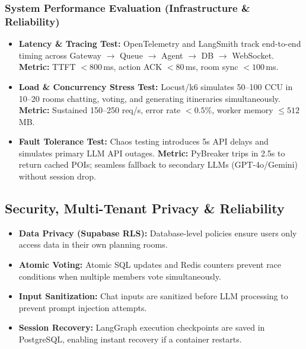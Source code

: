 \documentclass[11pt,a4paper]{article}
\begin{document}
\subsubsection{System Performance Evaluation (Infrastructure \& Reliability)}
\begin{itemize}[leftmargin=1.2em]
\item \textbf{Latency \& Tracing Test:} OpenTelemetry and LangSmith track end-to-end timing across Gateway $\rightarrow$ Queue $\rightarrow$ Agent $\rightarrow$ DB $\rightarrow$ WebSocket.
\textbf{Metric:} TTFT $< 800$\,ms, action ACK $< 80$\,ms, room sync $< 100$\,ms.
\item \textbf{Load \& Concurrency Stress Test:} Locust/k6 simulates 50--100 CCU in 10--20 rooms chatting, voting, and generating itineraries simultaneously.
\textbf{Metric:} Sustained 150--250 req/s, error rate $< 0.5\%$, worker memory $\le 512$\,MB.
\item \textbf{Fault Tolerance Test:} Chaos testing introduces 5s API delays and simulates primary LLM API outages.
\textbf{Metric:} PyBreaker trips in 2.5s to return cached POIs; seamless fallback to secondary LLMs (GPT-4o/Gemini) without session drop.
\end{itemize}

\subsection{Security, Multi-Tenant Privacy \& Reliability}
\label{sec:security_nfr}
\begin{itemize}[leftmargin=1.2em]
\item \textbf{Data Privacy (Supabase RLS):} Database-level policies ensure users only access data in their own planning rooms.
\item \textbf{Atomic Voting:} Atomic SQL updates and Redis counters prevent race conditions when multiple members vote simultaneously.
\item \textbf{Input Sanitization:} Chat inputs are sanitized before LLM processing to prevent prompt injection attempts.
\item \textbf{Session Recovery:} LangGraph execution checkpoints are saved in PostgreSQL, enabling instant recovery if a container restarts.
\end{itemize}
\end{document}

